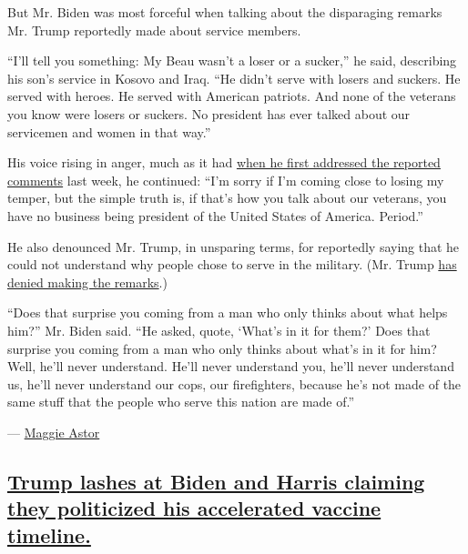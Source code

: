 But Mr. Biden was most forceful when talking about the disparaging
remarks Mr. Trump reportedly made about service members.

``I'll tell you something: My Beau wasn't a loser or a sucker,'' he
said, describing his son's service in Kosovo and Iraq. ``He didn't serve
with losers and suckers. He served with heroes. He served with American
patriots. And none of the veterans you know were losers or suckers. No
president has ever talked about our servicemen and women in that way.''

His voice rising in anger, much as it had
\href{https://www.nytimes3xbfgragh.onion/2020/09/04/us/politics/biden-trump-soliders-insults.html}{when
he first addressed the reported comments} last week, he continued: ``I'm
sorry if I'm coming close to losing my temper, but the simple truth is,
if that's how you talk about our veterans, you have no business being
president of the United States of America. Period.''

He also denounced Mr. Trump, in unsparing terms, for reportedly saying
that he could not understand why people chose to serve in the military.
(Mr. Trump
\href{https://www.nytimes3xbfgragh.onion/2020/09/04/us/politics/trump-veterans-losers.html}{has
denied making the remarks}.)

``Does that surprise you coming from a man who only thinks about what
helps him?'' Mr. Biden said. ``He asked, quote, `What's in it for them?'
Does that surprise you coming from a man who only thinks about what's in
it for him? Well, he'll never understand. He'll never understand you,
he'll never understand us, he'll never understand our cops, our
firefighters, because he's not made of the same stuff that the people
who serve this nation are made of.''

--- \href{https://www.nytimes3xbfgragh.onion/by/maggie-astor}{Maggie
Astor}

\hypertarget{trump-lashes-at-biden-and-harris-claiming-they-politicized-his-accelerated-vaccine-timeline}{%
\subsection{\texorpdfstring{\protect\hyperlink{trump-lashes-at-biden-and-harris-claiming-they-politicized-his-accelerated-vaccine-timeline}{Trump
lashes at Biden and Harris claiming they politicized his accelerated
vaccine
timeline.}}{Trump lashes at Biden and Harris claiming they politicized his accelerated vaccine timeline.}}\label{trump-lashes-at-biden-and-harris-claiming-they-politicized-his-accelerated-vaccine-timeline}}

